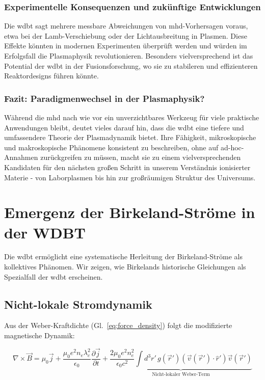\subsubsection{Experimentelle Konsequenzen und zukünftige Entwicklungen}
Die \gls{wdbt} sagt mehrere messbare Abweichungen von \gls{mhd}-Vorhersagen voraus, etwa bei der Lamb-Verschiebung oder der Lichtausbreitung in Plasmen. Diese Effekte könnten in
modernen Experimenten überprüft werden und würden im Erfolgsfall die Plasmaphysik revolutionieren. Besonders vielversprechend ist das Potential der \gls{wdbt} in der
Fusionsforschung, wo sie zu stabileren und effizienteren Reaktordesigns führen könnte.

\subsubsection{Fazit: Paradigmenwechsel in der Plasmaphysik?}
Während die \gls{mhd} nach wie vor ein unverzichtbares Werkzeug für viele praktische Anwendungen bleibt, deutet vieles darauf hin, dass die \gls{wdbt} eine tiefere und umfassendere
Theorie der Plasmadynamik bietet. Ihre Fähigkeit, mikroskopische und makroskopische Phänomene konsistent zu beschreiben, ohne auf ad-hoc-Annahmen zurückgreifen zu müssen, macht
sie zu einem vielversprechenden Kandidaten für den nächsten großen Schritt in unserem Verständnis ionisierter Materie - von Laborplasmen bis hin zur großräumigen Struktur des
Universums.

\section{Emergenz der Birkeland-Ströme in der WDBT}
\label{sec:birkeland_emergence}

Die \gls{wdbt} ermöglicht eine systematische Herleitung der Birkeland-Ströme als kollektives Phänomen. Wir zeigen, wie Birkelands historische Gleichungen als Spezialfall der \gls{wdbt}
erscheinen.

\subsection{Nicht-lokale Stromdynamik}
Aus der Weber-Kraftdichte (Gl.~\ref{eq:force_density}) folgt die modifizierte magnetische Dynamik:

\begin{equation}
\nabla \times \vec{B} = \mu_0\vec{j} + \frac{\mu_0 e^2 n_e \lambda_c^2}{\epsilon_0} \frac{\partial \vec{j}}{\partial t} + \underbrace{\frac{2\mu_0 e^2 n_e^2}{\epsilon_0 c^2} \int d^3r'\, g(\vec{r}')(\vec{v}(\vec{r}')\cdot\hat{r}')\vec{v}(\vec{r}')}_{\text{Nicht-lokaler Weber-Term}}
\label{eq:full_ampere}
\end{equation}

